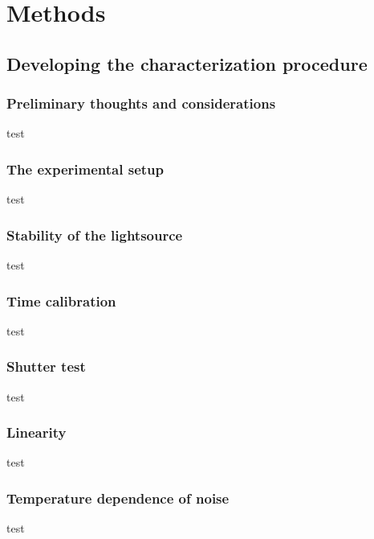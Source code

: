 \documentclass[../main.tex]{subfiles}
\begin{document}
	
	\chapter{Methods}
		\section{Developing the characterization procedure}
		\subsection{Preliminary thoughts and considerations}
		test
		\subsection{The experimental setup}
		test
		\subsection{Stability of the lightsource}
		test
		\subsection{Time calibration}
		test
		\subsection{Shutter test}
		test
		\subsection{Linearity}
		test
		\subsection{Temperature dependence of noise}
		test
	
\end{document}
